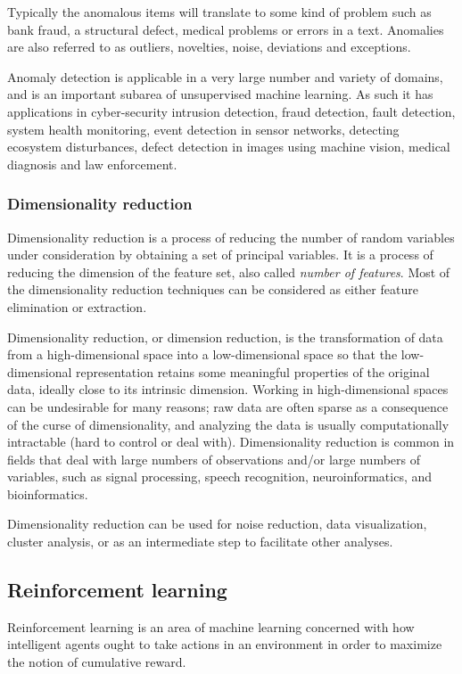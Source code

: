 Typically the anomalous items will translate to some kind of problem such as bank fraud, a structural defect, medical problems or errors in a text. Anomalies are also referred to as outliers, novelties, noise, deviations and exceptions.

Anomaly detection is applicable in a very large number and variety of domains, and is an important subarea of unsupervised machine learning. As such it has applications in cyber-security intrusion detection, fraud detection, fault detection, system health monitoring, event detection in sensor networks, detecting ecosystem disturbances, defect detection in images using machine vision, medical diagnosis and law enforcement.

\subsubsection{Dimensionality reduction}
Dimensionality reduction is a process of reducing the number of random variables under consideration by obtaining a set of principal variables. It is a process of reducing the dimension of the feature set, also called \emph{number of features}. Most of the dimensionality reduction techniques can be considered as either feature elimination or extraction.

Dimensionality reduction, or dimension reduction, is the transformation of data from a high-dimensional space into a low-dimensional space so that the low-dimensional representation retains some meaningful properties of the original data, ideally close to its intrinsic dimension. Working in high-dimensional spaces can be undesirable for many reasons; raw data are often sparse as a consequence of the curse of dimensionality, and analyzing the data is usually computationally intractable (hard to control or deal with). Dimensionality reduction is common in fields that deal with large numbers of observations and/or large numbers of variables, such as signal processing, speech recognition, neuroinformatics, and bioinformatics.

Dimensionality reduction can be used for noise reduction, data visualization, cluster analysis, or as an intermediate step to facilitate other analyses.

\subsection{Reinforcement learning}
Reinforcement learning is an area of machine learning concerned with how intelligent agents ought to take actions in an environment in order to maximize the notion of cumulative reward. 

